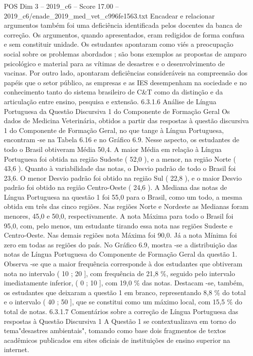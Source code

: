 \begin{textsample}{POS Dim 3 – 2019\_c6 – Score 17.00 – 2019\_c6/enade\_2019\_med\_vet\_c996fe1563.txt}
Encadear e relacionar argumentos também foi uma deficiência identificada pelos docentes da banca de correção.
Os argumentos, quando apresentados, eram redigidos de forma confusa e sem constituir unidade.
Os estudantes apontaram como viés a preocupação social sobre os problemas abordados ; são bons exemplos as propostas de amparo psicológico e material para as vítimas de desastres e o desenvolvimento de vacinas.
Por outro lado, apontaram deficiências consideráveis na compreensão dos papéis que o setor público, as empresas e as IES desempenham na sociedade e no conhecimento tanto do sistema brasileiro de C\&T como da distinção e da articulação entre ensino, pesquisa e extensão. 6.3.1.6 Análise de Língua Portuguesa da Questão Discursiva 1 do Componente de Formação Geral Os dados de Medicina Veterinária, obtidos a partir das respostas à questão discursiva 1 do Componente de Formação Geral, no que tange à Língua Portuguesa, encontram -se na Tabela 6.16 e no Gráfico 6.9.
Nesse aspecto, os estudantes de todo o Brasil obtiveram Média 50,4.
A maior Média em relação à Língua Portuguesa foi obtida na região Sudeste ( 52,0 ), e a menor, na região Norte ( 43,6 ).
Quanto à variabilidade das notas, o Desvio padrão de todo o Brasil foi 23,6.
O menor Desvio padrão foi obtido na região Sul ( 22,8 ), e o maior Desvio padrão foi obtido na região Centro-Oeste ( 24,6 ).
A Mediana das notas de Língua Portuguesa na questão 1 foi 55,0 para o Brasil, como um todo, a mesma obtida em três das cinco regiões.
Nas regiões Norte e Nordeste as Medianas foram menores, 45,0 e 50,0, respectivamente.
A nota Máxima para todo o Brasil foi 95,0, com, pelo menos, um estudante tirando essa nota nas regiões Sudeste e Centro-Oeste.
Nas demais regiões nota Máxima foi 90,0.
Já a nota Mínima foi zero em todas as regiões do país.
No Gráfico 6.9, mostra -se a distribuição das notas de Língua Portuguesa do Componente de Formação Geral da questão 1.
Observa -se que a maior frequência corresponde à dos estudantes que obtiveram nota no intervalo ( 10 ; 20 ], com frequência de 21,8 \%, seguido pelo intervalo imediatamente inferior, ( 0 ; 10 ], com 19,0 \% das notas.
Destacam -se, também, os estudantes que deixaram a questão 1 em branco, representando 8,8 \% do total e o intervalo ( 40 ; 50 ], que se constitui como um máximo local, com 15,5 \% do total de notas. 6.3.1.7 Comentários sobre a correção de Língua Portuguesa das respostas à Questão Discursiva 1 A Questão 1 se contextualizava em torno do tema"desastres ambientais", tomando como base dois fragmentos de textos acadêmicos publicados em sites oficiais de instituições de ensino superior na internet.

\end{textsample}
